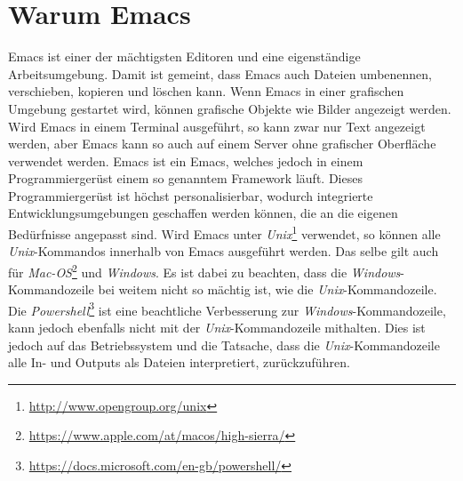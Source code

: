 \section{Warum Emacs}
Emacs ist einer der mächtigsten Editoren und eine eigenständige
Arbeitsumgebung. Damit ist gemeint, dass Emacs auch Dateien
umbenennen, verschieben, kopieren und löschen kann. Wenn Emacs in
einer grafischen Umgebung gestartet wird, können grafische Objekte wie
Bilder angezeigt werden. Wird Emacs in einem Terminal ausgeführt, so
kann zwar nur Text angezeigt werden, aber Emacs kann so auch auf einem
Server ohne grafischer Oberfläche verwendet werden. Emacs ist ein
Emacs, welches jedoch in einem Programmiergerüst einem so genanntem
{\glqq}Framework{\grqq} läuft. Dieses Programmiergerüst ist höchst
personalisierbar, wodurch integrierte Entwicklungsumgebungen
geschaffen werden können, die an die eigenen Bedürfnisse angepasst
sind. Wird Emacs unter
\textit{Unix}\footnote{\url{http://www.opengroup.org/unix}} verwendet,
so können alle \textit{Unix}-Kommandos innerhalb von Emacs ausgeführt
werden. Das selbe gilt auch für
\textit{Mac-OS}\footnote{\url{https://www.apple.com/at/macos/high-sierra/}}
und \textit{Windows}. Es ist dabei zu beachten, dass die
\textit{Windows}-Kommandozeile bei weitem nicht so mächtig ist, wie
die \textit{Unix}-Kommandozeile. Die
\textit{Powershell}\footnote{\url{https://docs.microsoft.com/en-gb/powershell/}}
ist eine beachtliche Verbesserung zur \textit{Windows}-Kommandozeile,
kann jedoch ebenfalls nicht mit der \textit{Unix}-Kommandozeile
mithalten. Dies ist jedoch auf das Betriebssystem und die Tatsache,
dass die \textit{Unix}-Kommandozeile alle In- und Outputs als Dateien
interpretiert, zurückzuführen. \cite{CameronRosenblattRaymond1996}\\
